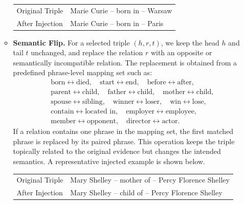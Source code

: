 \documentclass{article}
\theoremstyle{plain}
\theoremstyle{definition}
\theoremstyle{remark}
\begin{document}
\begin{itemize}
\begin{itemize}
        \begin{center}
        \begin{tabular}{ll}
        \toprule
        Original Triple & \small
        Marie Curie -- born in -- Warsaw \\
        After Injection & \small
        Marie Curie -- born in -- Paris \\
        \bottomrule
        \end{tabular}
        \end{center}

        \item \textbf{Semantic Flip.}
        For a selected triple $(h,r,t)$, we keep the head $h$ and tail $t$ unchanged, and replace the relation $r$ with an opposite or semantically incompatible relation. 
        The replacement is obtained from a predefined phrase-level mapping set such as:
        \[
        \begin{aligned}
        &\text{born} \leftrightarrow \text{died},\quad
        \text{start} \leftrightarrow \text{end},\quad
        \text{before} \leftrightarrow \text{after},\\
        &\text{parent} \leftrightarrow \text{child},\quad
        \text{father} \leftrightarrow \text{child},\quad
        \text{mother} \leftrightarrow \text{child},\\
        &\text{spouse} \leftrightarrow \text{sibling},\quad
        \text{winner} \leftrightarrow \text{loser},\quad
        \text{win} \leftrightarrow \text{lose},\\
        &\text{contain} \leftrightarrow \text{located in},\quad
        \text{employer} \leftrightarrow \text{employee},\\
        &\text{member} \leftrightarrow \text{opponent},\quad
        \text{director} \leftrightarrow \text{actor}.
        \end{aligned}
        \]
        If a relation contains one phrase in the mapping set, the first matched phrase is replaced by its paired phrase. 
        This operation keeps the triple topically related to the original evidence but changes the intended semantics. A representative injected example is shown below.

        \begin{center}
        \begin{tabular}{ll}
        \toprule
        Original Triple & \small Mary Shelley -- mother of -- Percy Florence Shelley\\
        After Injection & \small Mary Shelley -- child of -- Percy Florence Shelley \\
        \bottomrule
        \end{tabular}
        \end{center}
    \end{itemize}


\end{itemize}
\end{document}
